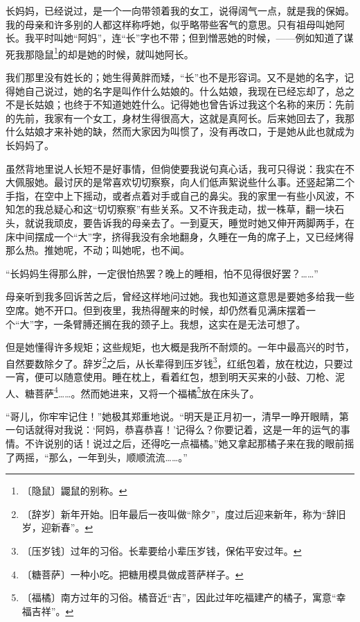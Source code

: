 \documentclass[12pt,UTF-8,openany]{ctexbook}
\begin{document}
\begin{large}
    
    长妈妈，已经说过，是一个一向带领着我的女工，说得阔气一点，就是我的保姆。我的母亲和许多别的人都这样称呼她，似乎略带些客气的意思。只有祖母叫她阿长。我平时叫她“阿妈”，连“长”字也不带；但到憎恶她的时候，——例如知道了谋死我那隐鼠\footnote{〔隐鼠〕鼹鼠的别称。}的却是她的时候，就叫她阿长。
    
    我们那里没有姓长的；她生得黄胖而矮，“长”也不是形容词。又不是她的名字，记得她自己说过，她的名字是叫作什么姑娘的。什么姑娘，我现在已经忘却了，总之不是长姑娘；也终于不知道她姓什么。记得她也曾告诉过我这个名称的来历：先前的先前，我家有一个女工，身材生得很高大，这就是真阿长。后来她回去了，我那什么姑娘才来补她的缺，然而大家因为叫惯了，没有再改口，于是她从此也就成为长妈妈了。
    
    虽然背地里说人长短不是好事情，但倘使要我说句真心话，我可只得说：我实在不大佩服她。最讨厌的是常喜欢切切察察，向人们低声絮说些什么事。还竖起第二个手指，在空中上下摇动，或者点着对手或自己的鼻尖。我的家里一有些小风波，不知怎的我总疑心和这“切切察察”有些关系。又不许我走动，拔一株草，翻一块石头，就说我顽皮，要告诉我的母亲去了。一到夏天，睡觉时她又伸开两脚两手，在床中间摆成一个“大”字，挤得我没有余地翻身，久睡在一角的席子上，又已经烤得那么热。推她呢，不动；叫她呢，也不闻。
    
    “长妈妈生得那么胖，一定很怕热罢？晚上的睡相，怕不见得很好罢？……”
    
    母亲听到我多回诉苦之后，曾经这样地问过她。我也知道这意思是要她多给我一些空席。她不开口。但到夜里，我热得醒来的时候，却仍然看见满床摆着一个“大”字，一条臂膊还搁在我的颈子上。我想，这实在是无法可想了。
    
    但是她懂得许多规矩；这些规矩，也大概是我所不耐烦的。一年中最高兴的时节，自然要数除夕了。辞岁\footnote{〔辞岁〕新年开始。旧年最后一夜叫做“除夕”，度过后迎来新年，称为“辞旧岁，迎新春”。}之后，从长辈得到压岁钱\footnote{〔压岁钱〕过年的习俗。长辈要给小辈压岁钱，保佑平安过年。}，红纸包着，放在枕边，只要过一宵，便可以随意使用。睡在枕上，看着红包，想到明天买来的小鼓、刀枪、泥人、糖菩萨\footnote{〔糖菩萨〕一种小吃。把糖用模具做成菩萨样子。}……。然而她进来，又将一个福橘\footnote{〔福橘〕南方过年的习俗。橘音近“吉”，因此过年吃福建产的橘子，寓意“幸福吉祥”。}放在床头了。
    
    “哥儿，你牢牢记住！”她极其郑重地说。“明天是正月初一，清早一睁开眼睛，第一句话就得对我说：‘阿妈，恭喜恭喜！’记得么？你要记着，这是一年的运气的事情。不许说别的话！说过之后，还得吃一点福橘。”她又拿起那橘子来在我的眼前摇了两摇，“那么，一年到头，顺顺流流……。”
    

\end{large}
\end{document}
